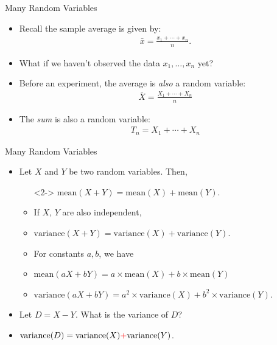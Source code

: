 \documentclass[10pt, handout, xcolor=table]{beamer}
\begin{document}
\begin{frame}{Many Random Variables}
\begin{itemize}
\setlength{\itemsep}{15pt}
\item<1-> Recall the sample average is given by:
\begin{align*}
\bar{x} = \frac{x_1 + \cdots + x_n}{n}.
\end{align*} 
\item<2-> What if we haven't observed the data $x_1,\dots, x_n$ yet?
\item<3->  Before an experiment, the average is \emph{also} a random variable:
\begin{align*}
\bar{X} = \frac{X_1 + \cdots + X_n}{n}
\end{align*}
\item<4-> The \emph{sum} is also a random variable:
\begin{align*}
T_n = X_1 + \cdots + X_n
\end{align*}
\end{itemize}
\end{frame}

\begin{frame}{Many Random Variables}
\begin{itemize}
\setlength{\itemsep}{15pt}
\item<1-> Let $X$ and $Y$ be two random variables. Then,
\vspace{0.25cm}
\begin{itemize}
\setlength{\itemsep}{10pt}
\item[]<2-> {\color{blue}$\text{mean}(X + Y) = \text{mean}(X) + \text{mean}(Y).$} 
\item<3-> If $X$, $Y$ are also independent,
\item<3->[] {\color{blue}$\text{variance}(X +Y) = \text{variance}(X) + \text{variance}(Y).$}
\item<4-> For constants $a, b$, we have
\item<4->[] {\color{blue}$\text{mean}(aX + bY) = a\times \text{mean}(X) + b\times\text{mean}(Y)$}
\item<4->[] {\color{blue}$\text{variance}(aX + bY) = a^2\times\text{variance}(X) + b^2\times\text{variance}(Y).$}
\end{itemize}
\item<5-> Let $D = X - Y$. What is the variance of $D$?
\item<6->[] \color{blue}$\text{variance}(D) = \text{variance}(X) {\color{red}  +  } \text{variance}(Y)$.
\end{itemize}
\end{frame}
\end{document}
